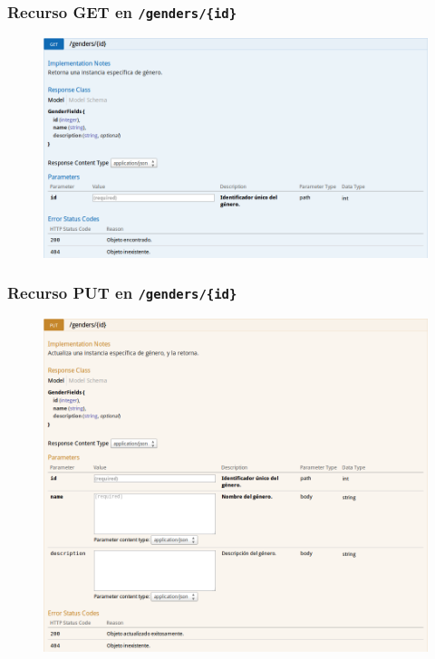 \newpage


\subsubsection{Recurso GET en \texttt{/genders/\{id\}}}

\begin{figure}[h]
  \centering
  \includegraphics[width=\textwidth,height=.75\textheight,keepaspectratio]{img/especificacion_api/genderView_get}
  \label{genderView_get}
\end{figure}

\newpage


\subsubsection{Recurso PUT en \texttt{/genders/\{id\}}}

\begin{figure}[h]
  \centering
  \includegraphics[width=\textwidth,height=.75\textheight,keepaspectratio]{img/especificacion_api/genderView_put}
  \label{genderView_put}
\end{figure}

